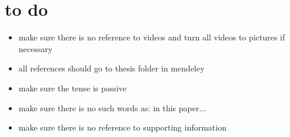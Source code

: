 \chapter{to do}
\begin{itemize}
	\item make sure there is no reference to videos and turn all videos to pictures if necessary
	\item all references should go to thesis folder in mendeley
	\item make sure the tense is passive
	\item make sure there is no such words as: in this paper...
	\item make sure there is no reference to supporting information
\end{itemize}
